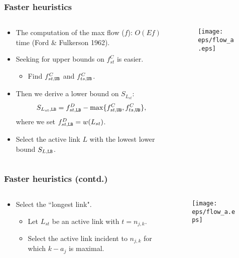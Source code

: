 \documentclass[xcolor=dvipsnames,envcountsect,handout]{beamer}
\begin{document}
\begin{frame}
\frametitle{Faster heuristics}
\vspace{-8pt}
\begin{columns}
\begin{column}[t]{7.5cm}
\begin{itemize}
\item The computation of the max flow ($f$): $O(Ef)$ time 
(Ford \& Fulkerson 1962).
\vspace{5pt}
\item Seeking for upper bounds on $f_{st}^C$ is easier. 
\vspace{-8pt}
\begin{itemize}
\item Find $f_{st,{\tt UB}}^C$ and $f_{ts,{\tt UB}}^C$. 
\end{itemize}
\vspace{5pt}
\item Then we derive a lower bound on $S_{L_{st}}$: 
\[
S_{L_{st},{\tt LB}} = f_{st,{\tt LB}}^D - 
\max\{f_{st,{\tt UB}}^C, f_{ts,{\tt UB}}^C\},
\]
where we set $f_{st,{\tt LB}}^D = w(L_{st})$. 
\vspace{5pt}
\item Select the active link $L$ with the lowest lower bound
$S_{L,{\tt LB}}$. 
\end{itemize}
\end{column}
\begin{column}[t]{4.5cm}
\begin{figure}[H]
\centering
\texttt{[image: eps/flow\_a.eps]}
\end{figure}
\end{column}
\end{columns}
\end{frame}


\begin{frame}
\frametitle{Faster heuristics (contd.)}
\vspace{-8pt}
\begin{columns}
\begin{column}[t]{7.5cm}
\begin{itemize}
\item Select the ``longest link". 
\begin{itemize}
\item Let $L_{st}$ be an active link with $t =  n_{j,k}$. 
\vspace{5pt}
\item Select the active link incident to $n_{j,k}$ for which
$k-a_j$ is maximal. 
\end{itemize}
\end{itemize}
\end{column}
\begin{column}[t]{4.5cm}
\begin{figure}[H]
\centering
\texttt{[image: eps/flow\_a.eps]}
\end{figure}
\end{column}
\end{columns}
\end{frame}
\end{document}
